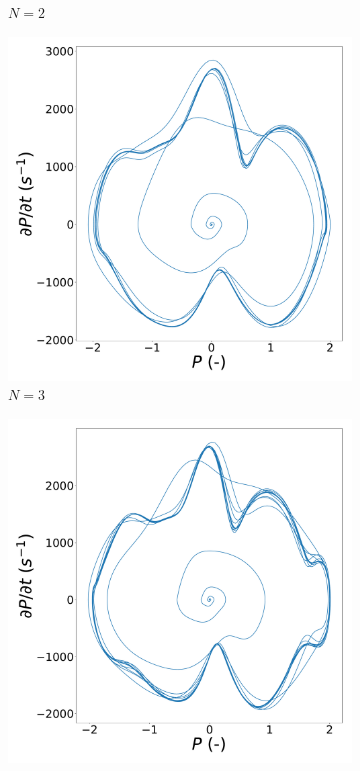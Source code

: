 \begin{figure}
\begin{subfigure}[b]{.49\linewidth}
        \caption{$N=2$}
        \label{fig:VDP_phase_N2}
    \end{subfigure}
    \hfill
    \begin{subfigure}[b]{.49\linewidth}
        \includegraphics[width=\linewidth]{img/phase_diagram_N3.pdf}
        \caption{$N=3$}
        \label{fig:VDP_phase_N3}
    \end{subfigure}
    \hfill
    \begin{subfigure}[b]{.49\linewidth}
        \includegraphics[width=\linewidth]{img/phase_diagram_N4.pdf}

\end{subfigure}
\end{figure}
